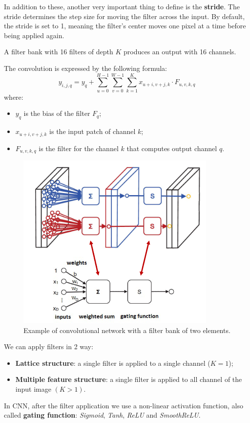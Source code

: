 In addition to these, another very important thing to define is the \textbf{stride}.
The stride determines the step size for moving the filter across the input. By
default, the stride is set to 1, meaning the filter's center moves one pixel at
a time before being applied again.

\begin{note}
    A filter bank with 16 filters of depth $K$ produces an output with 16 channels.
\end{note}

The convolution is expressed by the following formula:
\begin{equation}
    y_{i, j, q} = y_q + \sum_{u = 0}^{H - 1}\sum_{v = 0}^{W - 1}\sum_{k = 1}^{K} x_{u + i, v + j, k} \cdot F_{u, v, k, q}
\end{equation}
where:
\begin{itemize}
    \item $y_q$ is the bias of the filter $F_q$;
    \item $x_{u + i, v + j, k}$ is the input patch of channel $k$;
    \item $F_{u, v, k, q}$ is the filter for the channel $k$ that computes output
          channel $q$.
\end{itemize}

\begin{figure}[!ht]
    \centering
    \includegraphics[width=0.25\linewidth]{img/CNN/Conv2Filter.png}
    \caption{Example of convolutional network with a filter bank of two elements.}
    \label{fig:conv2filter}
\end{figure}

We can apply filters in 2 way:
\begin{itemize}
    \item \textbf{Lattice structure}: a single filter is applied to a single
          channel ($K = 1$);
    \item \textbf{Multiple feature structure}: a single filter is applied to all
          channel of the input image $(K > 1)$.
\end{itemize}

In CNN, after the filter application we use a non-linear activation function,
also called \textbf{gating function}: \textit{Sigmoid}, \textit{Tanh}, \textit{ReLU}
and \textit{SmoothReLU}.

